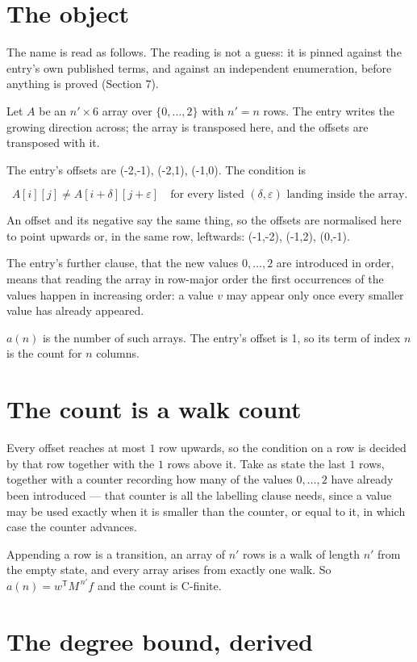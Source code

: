 \documentclass[11pt]{article}
\theoremstyle{definition}
\begin{document}
\section{The object}

The name is read as follows. The reading is not a guess: it is pinned against the entry's own published terms, and against an independent enumeration, before anything is proved (Section 7).

Let $A$ be an $n' \times 6$ array over $\{0,\dots,2\}$ with $n' = n$ rows. The entry writes the growing direction across; the array is transposed here, and the offsets are transposed with it.

The entry's offsets are (-2,-1), (-2,1), (-1,0). The condition is

\[A[i][j] \ne A[i{+}\delta][j{+}\varepsilon]\quad\text{for every listed }(\delta,\varepsilon)\text{ landing inside the array.}\]

An offset and its negative say the same thing, so the offsets are normalised here to point upwards or, in the same row, leftwards: (-1,-2), (-1,2), (0,-1).

The entry's further clause, that the new values $0,\dots,2$ are introduced in order, means that reading the array in row-major order the first occurrences of the values happen in increasing order: a value $v$ may appear only once every smaller value has already appeared.

$a(n)$ is the number of such arrays. The entry's offset is 1, so its term of index $n$ is the count for $n$ columns.

\section{The count is a walk count}

Every offset reaches at most $1$ row upwards, so the condition on a row is decided by that row together with the $1$ rows above it. Take as state the last $1$ rows, together with a counter recording how many of the values $0,\dots,2$ have already been introduced --- that counter is all the labelling clause needs, since a value may be used exactly when it is smaller than the counter, or equal to it, in which case the counter advances.

Appending a row is a transition, an array of $n'$ rows is a walk of length $n'$ from the empty state, and every array arises from exactly one walk. So $a(n) = w^{\mathsf T}M^{\,n'}f$ and the count is C-finite.

\section{The degree bound, derived}
\end{document}
